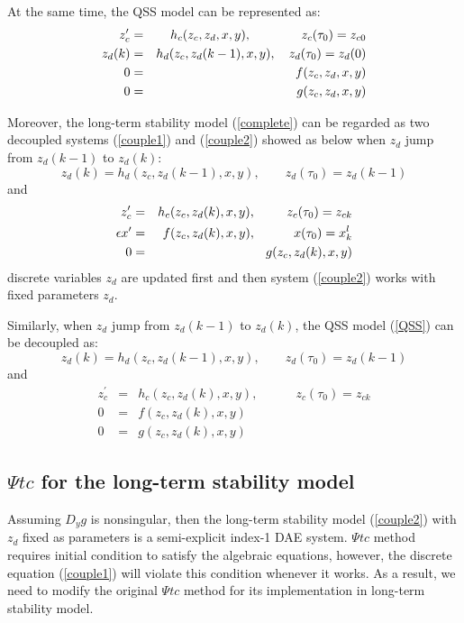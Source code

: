 \documentclass[journal]{IEEEtran}
\newcommand{\ee}{\epsilon}
\begin{document}
At the same time, the QSS model can be represented as:
\begin{eqnarray}\label{QSS}
{z}_{c}^\prime&=&{h}_c({z_c,z_d,x,y}),\hspace{0.55in}{z_c(\tau_0)=z_{c0}}\\
z_d(k)&=&h_d(z_c,z_d(k-1),x,y),\quad z_d(\tau_0)=z_{d}(0)\nonumber\\
{0}&=&{f}({z_c,z_d,x,y})\nonumber\\{0}&=&{g}({z_c,z_d,x,y})\nonumber \end{eqnarray}


Moreover, the long-term stability model (\ref{complete}) can be regarded as two decoupled systems (\ref{couple1}) and (\ref{couple2}) showed as below when $z_d$ jump from $z_d(k-1)$ to $z_d(k)$:
\begin{equation}
z_d(k)=h_d(z_c,z_d(k-1),x,y),\qquad z_d(\tau_0)=z_{d}(k-1) \label{couple1}
\end{equation}
and
\begin{eqnarray}\label{couple2}
{z}_{c}^\prime&=&{h}_c({z_c,z_d(k),x,y}),\hspace{0.34in}{z_c(\tau_0)={z}_{ck}}\\
\ee{x}^\prime&=&{f}({z_c,z_d(k),x,y}),\qquad\quad{x(\tau_0)=x_k^l}\nonumber\\
{0}&=&{g}({z_c,z_d(k),x,y})\nonumber \end{eqnarray}
discrete variables $z_d$ are updated first and then system (\ref{couple2}) works with fixed parameters $z_d$.

Similarly, when $z_d$ jump from $z_d(k-1)$ to $z_d(k)$, the QSS model (\ref{QSS}) can be decoupled as:
\begin{equation}
z_d(k)=h_d(z_c,z_d(k-1),x,y),\qquad z_d(\tau_0)=z_{d}(k-1) \label{coupleqss1}
\end{equation}
and
\begin{eqnarray}\label{coupleqss2}
{z}_{c}^\prime&=&{h}_c({z_c,z_d(k),x,y}),\qquad\quad {z_c(\tau_0)=z_{ck}}\\
{0}&=&{f}({z_c,z_d(k),x,y})\nonumber\\{0}&=&{g}({z_c,z_d(k),x,y})\nonumber \end{eqnarray}

\subsection{$\Psi tc$ for the long-term stability model}
Assuming $D_y g$ is nonsingular, then the long-term stability model (\ref{couple2}) with $z_d$ fixed as parameters is a semi-explicit index-1 DAE system. $\Psi tc$ method requires initial condition to satisfy the algebraic equations, however, the discrete equation (\ref{couple1}) will violate this condition whenever it works. As a result, we need to modify the original $\Psi tc$ method for its implementation in long-term stability model.
\end{document}
